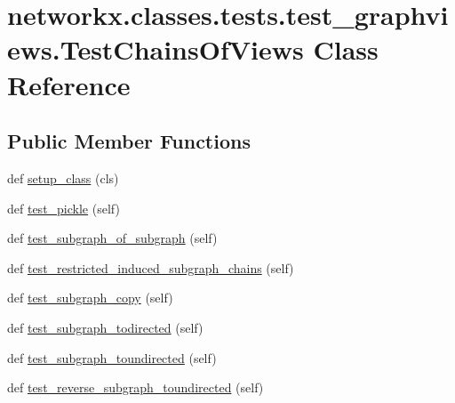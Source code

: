 \hypertarget{classnetworkx_1_1classes_1_1tests_1_1test__graphviews_1_1TestChainsOfViews}{}\section{networkx.\+classes.\+tests.\+test\+\_\+graphviews.\+Test\+Chains\+Of\+Views Class Reference}
\label{classnetworkx_1_1classes_1_1tests_1_1test__graphviews_1_1TestChainsOfViews}
\subsection*{Public Member Functions}
\begin{DoxyCompactItemize}
\item 
def \hyperlink{classnetworkx_1_1classes_1_1tests_1_1test__graphviews_1_1TestChainsOfViews_a0e920a1e2dc4824b6bc6b0ad23919040}{setup\+\_\+class} (cls)
\item 
def \hyperlink{classnetworkx_1_1classes_1_1tests_1_1test__graphviews_1_1TestChainsOfViews_a9bb0885de64caf3b3fcefa97c92e25b6}{test\+\_\+pickle} (self)
\item 
def \hyperlink{classnetworkx_1_1classes_1_1tests_1_1test__graphviews_1_1TestChainsOfViews_adb92100558956a2935687506a8ddd79e}{test\+\_\+subgraph\+\_\+of\+\_\+subgraph} (self)
\item 
def \hyperlink{classnetworkx_1_1classes_1_1tests_1_1test__graphviews_1_1TestChainsOfViews_af166f8baab99302cb53815e4a6e785ef}{test\+\_\+restricted\+\_\+induced\+\_\+subgraph\+\_\+chains} (self)
\item 
def \hyperlink{classnetworkx_1_1classes_1_1tests_1_1test__graphviews_1_1TestChainsOfViews_a97dc86616930a7a872285448d4f29884}{test\+\_\+subgraph\+\_\+copy} (self)
\item 
def \hyperlink{classnetworkx_1_1classes_1_1tests_1_1test__graphviews_1_1TestChainsOfViews_a5a19e97786087fea04055af3a93002d4}{test\+\_\+subgraph\+\_\+todirected} (self)
\item 
def \hyperlink{classnetworkx_1_1classes_1_1tests_1_1test__graphviews_1_1TestChainsOfViews_a3ba5258cdb0392b7356b3404275f30dc}{test\+\_\+subgraph\+\_\+toundirected} (self)
\item 
def \hyperlink{classnetworkx_1_1classes_1_1tests_1_1test__graphviews_1_1TestChainsOfViews_a16a29ef74eff825e082525a129de890c}{test\+\_\+reverse\+\_\+subgraph\+\_\+toundirected} (self)
\item 

\end{DoxyCompactItemize}
